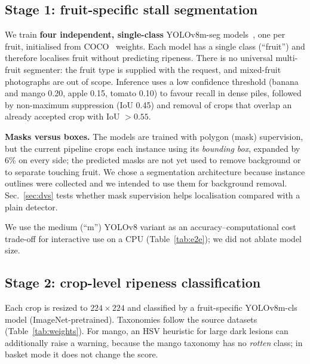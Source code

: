\documentclass[10pt,twocolumn]{article}
\begin{document}
\subsection{Stage 1: fruit-specific stall segmentation}
We train \textbf{four independent, single-class} YOLOv8m-seg models~\cite{jocher2023yolov8}, one per fruit, initialised from COCO~\cite{lin2014coco} weights. Each model has a single class (``fruit'') and therefore localises fruit without predicting ripeness. There is no universal multi-fruit segmenter: the fruit type is supplied with the request, and mixed-fruit photographs are out of scope. Inference uses a low confidence threshold (banana and mango 0.20, apple 0.15, tomato 0.10) to favour recall in dense piles, followed by non-maximum suppression (IoU 0.45) and removal of crops that overlap an already accepted crop with IoU $>0.55$.

\textbf{Masks versus boxes.} The models are trained with polygon (mask) supervision, but the current pipeline crops each instance using its \emph{bounding box}, expanded by 6\% on every side; the predicted masks are not yet used to remove background or to separate touching fruit. We chose a segmentation architecture because instance outlines were collected and we intended to use them for background removal. Sec.~\ref{sec:dvs} tests whether mask supervision helps localisation compared with a plain detector.

We use the medium (``m'') YOLOv8 variant as an accuracy--computational cost trade-off for interactive use on a CPU (Table~\ref{tab:e2e}); we did not ablate model size.

\subsection{Stage 2: crop-level ripeness classification}
Each crop is resized to $224\times224$ and classified by a fruit-specific YOLOv8m-cls model (ImageNet-pretrained). Taxonomies follow the source datasets (Table~\ref{tab:weights}). For mango, an HSV heuristic for large dark lesions can additionally raise a warning, because the mango taxonomy has no \emph{rotten} class; in basket mode it does not change the score.
\end{document}
